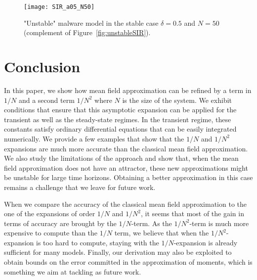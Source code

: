 \documentclass[sigconf]{acmart}
\begin{document}
\begin{figure}[ht]
  \centering
  \texttt{[image: SIR\_a05\_N50]}
  
  \caption{"Unstable" malware model in the stable case $\delta=0.5$
    and $N=50$ (complement of Figure~\ref{fig:unstableSIR}).}
  \label{fig:unstableSIR_delta05}
\end{figure}





\section{Conclusion}
\label{sec:conclusion}

In this paper, we show how mean field approximation can be refined by
a term in $1/N$ and a second term $1/N^2$ where $N$ is the size of the
system. We exhibit conditions that ensure that this asymptotic
expansion can be applied for the transient as well as the steady-state
regimes. In the transient regime, these constants satisfy ordinary
differential equations that can be easily integrated numerically.  We
provide a few examples that show that the $1/N$ and $1/N^2$ expansions
are much more accurate than the classical mean field approximation.
We also study the limitations of the approach and show that, when the mean
field approximation does not have an attractor, these new
approximations might be unstable for large time horizons.  Obtaining a
better approximation in this case remains a challenge that we leave for
future work.

When we compare the accuracy of the classical mean field approximation
to the one of the expansions of order $1/N$ and $1/N^2$, it seems that
most of the gain in terms of accuracy are brought by the $1/N$-term.
As the $1/N^2$-term is much more expensive to compute than the $1/N$
term, we believe that when the $1/N^2$-expansion is too hard to
compute, staying with the $1/N$-expansion is already sufficient for
many models.  Finally, our derivation may also be exploited to
  obtain bounds on the error committed in the approximation of
  moments, which is something we aim at tackling as future work.



\end{document}
